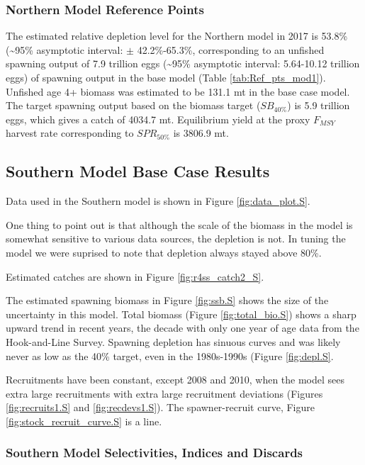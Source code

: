 \documentclass[12pt,]{article}
\begin{document}
\subsubsection{Northern Model Reference
Points}\label{northern-model-reference-points}

The estimated relative depletion level for the Northern model in 2017 is
53.8\% (\textasciitilde{}95\% asymptotic interval: \(\pm\)
42.2\%-65.3\%, corresponding to an unfished spawning output of 7.9
trillion eggs (\textasciitilde{}95\% asymptotic interval: 5.64-10.12
trillion eggs) of spawning output in the base model (Table
\ref{tab:Ref_pts_mod1}). Unfished age 4+ biomass was estimated to be
131.1 mt in the base case model. The target spawning output based on the
biomass target (\(SB_{40\%}\)) is 5.9 trillion eggs, which gives a catch
of 4034.7 mt. Equilibrium yield at the proxy \(F_{MSY}\) harvest rate
corresponding to \(SPR_{50\%}\) is 3806.9 mt.

\clearpage

\subsection{Southern Model Base Case
Results}\label{southern-model-base-case-results}

Data used in the Southern model is shown in Figure
\ref{fig:data_plot.S}.

One thing to point out is that although the scale of the biomass in the
model is somewhat sensitive to various data sources, the depletion is
not. In tuning the model we were suprised to note that depletion always
stayed above 80\%.

Estimated catches are shown in Figure \ref{fig:r4ss_catch2_S}.

The estimated spawning biomass in Figure \ref{fig:ssb.S} shows the size
of the uncertainty in this model. Total biomass (Figure
\ref{fig:total_bio.S}) shows a sharp upward trend in recent years, the
decade with only one year of age data from the Hook-and-Line Survey.
Spawning depletion has sinuous curves and was likely never as low as the
40\% target, even in the 1980s-1990s (Figure \ref{fig:depl.S}.

Recruitments have been constant, except 2008 and 2010, when the model
sees extra large recruitments with extra large recruitment deviations
(Figures \ref{fig:recruits1.S} and \ref{fig:recdevs1.S}). The
spawner-recruit curve, Figure \ref{fig:stock_recruit_curve.S} is a line.

\subsubsection{Southern Model Selectivities, Indices and
Discards}\label{southern-model-selectivities-indices-and-discards}
\end{document}
